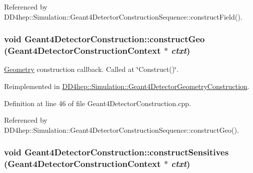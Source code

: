 Referenced by DD4hep::Simulation::Geant4DetectorConstructionSequence::constructField().\hypertarget{class_d_d4hep_1_1_simulation_1_1_geant4_detector_construction_a91ab552e6ee76df9e0ebff3351863ebd}{
\subsubsection[{constructGeo}]{\setlength{\rightskip}{0pt plus 5cm}void Geant4DetectorConstruction::constructGeo ({\bf Geant4DetectorConstructionContext} $\ast$ {\em ctxt})}}
\label{class_d_d4hep_1_1_simulation_1_1_geant4_detector_construction_a91ab552e6ee76df9e0ebff3351863ebd}


\hyperlink{namespace_d_d4hep_1_1_geometry}{Geometry} construction callback. Called at \char`\"{}Construct()\char`\"{}. 

Reimplemented in \hyperlink{class_d_d4hep_1_1_simulation_1_1_geant4_detector_geometry_construction_ab20b86bfe9009f93ce567ef418e266af}{DD4hep::Simulation::Geant4DetectorGeometryConstruction}.

Definition at line 46 of file Geant4DetectorConstruction.cpp.

Referenced by DD4hep::Simulation::Geant4DetectorConstructionSequence::constructGeo().\hypertarget{class_d_d4hep_1_1_simulation_1_1_geant4_detector_construction_a852a3cd581f106a1f8c65122fb517dab}{
\subsubsection[{constructSensitives}]{\setlength{\rightskip}{0pt plus 5cm}void Geant4DetectorConstruction::constructSensitives ({\bf Geant4DetectorConstructionContext} $\ast$ {\em ctxt})}}
\label{class_d_d4hep_1_1_simulation_1_1_geant4_detector_construction_a852a3cd581f106a1f8c65122fb517dab}


